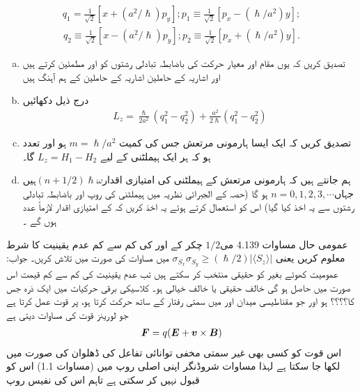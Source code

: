 \begin{align*}
    q_1=\frac{1}{\sqrt{2}}[x+(a^2/\hslash)p_y] ; p_1\equiv\frac{1}{\sqrt{2}}[p_x-(\hslash/a^2)y];
\end{align*}
\begin{align*}
    q_2\equiv\frac{1}{\sqrt{2}}[x-(a^2/\hslash)p_y];p_2\equiv\frac{1}{\sqrt{2}}[p_x+(\hslash/a^2)y].
\end{align*}
\begin{enumerate}[a.]
\item  تصدیق کریں کہ  یوں مقام اور معیار حرکت کی باضابطہ تبادلی رشتوں کو   اور   مطمئین کرتے ہیں اور اشاریہ   کے حاملین اشاریہ  کے حاملین کے ہم آہنگ ہیں 
\item  درج ذیل دکھائیں 
\begin{align*}
    L_z=\frac{\hslash}{2a^2}(q_1^2-q_2^2)+\frac{a^2}{2\hslash}(q_1^2-q_2^2)
\end{align*}
\item تصدیق کریں کہ ایک ایسا ہارمونی مرتعش جس کی کمیت  
\(m=\hslash/a^2\) 
ہو اور تعدد   ہو کہ ہر ایک ہیملٹنی  کے لیے \(L_z=H_1-H_2\) گا۔ 
\item ہم جانتے ہیں کہ ہارمونی مرتعش کے ہیملٹنی کی   امتیازی اقدار\((n+1/2)\hslash\omega\)ہیں جہاں\(n=0,1,2,3,\cdots\) ہو گا (حصہ  کے الجبرائی نظریہ میں ہیملٹنی کی روپ اور باضابطہ تبادلی رشتوں سے یہ اخذ کیا گیا) اس کو استعمال کرتے ہوئے یہ اخذ کریں کہ  کے امتیازی اقدار لازماً عدد ہوں گے ۔
\end{enumerate}
عمومی حال مساوات 4.139 می\(1/2\) چکر کے  اور  کی کم سے کم عدم یقینیت کا شرط معلوم کریں یعنی \(\sigma_{S_{x}}\sigma_{S_{y}}\geq(\hslash/2)|\langle S_z\rangle|\) میں مساوات کی صورت میں تلاش کریں۔ جواب: عمومیت کھوئے بغیر  کو حقیقی منتخب کر سکتے ہیں تب عدم یقینیت کی کم سے کم قیمت اس صورت میں حاصل ہو گی  خالف حقیقی یا خالف خیالی ہو۔
کلاسیکی برقی حرکیات میں ایک ذرہ جس کا؟؟؟؟  ہو اور جو مقناطیسی میدان  اور   میں سمتی رفتار   کے ساتھ حرکت کرتا ہو، پر قوت عمل کرتا ہے جو لورینز قوت کی مساوات دیتی ہے \begin{align}
    {\ensuremath{{\boldsymbol{F}}}}=q({{\boldsymbol{E}}}+{{\boldsymbol{v}}}\times{\ensuremath{{\boldsymbol{B}}}})
\end{align}
اس قوت کو کسی بھی غیر سمتی مخفی توانائی تفاعل کی ڈھلوان کی صورت میں لکھا جا سکتا ہے لہذا مساوات شروڈنگر اپنی اصلی روپ میں (مساوات 1.1) اس کو قبول نہیں کر سکتی ہے تاہم اس کی نفیس روپ 
